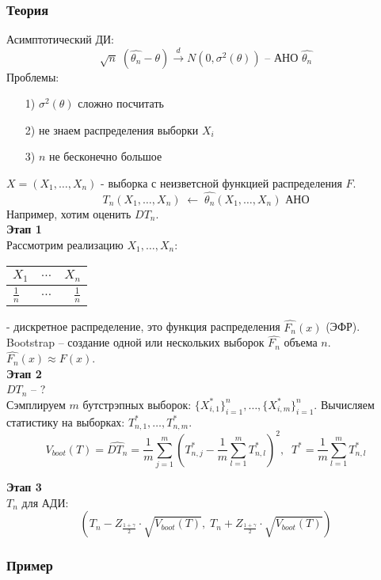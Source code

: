 \subsubsection*{Теория}\label{cha:compl/sec:norm/subsec:bootstrap/subsubsection:theory}

Асимптотический ДИ:
$$\sqrt{n} \; (\hat{\theta_n} - \theta) \xrightarrow[]{d} N(0, \sigma^2(\theta)) \text{ -- АНО } \hat{\theta_n}$$
Проблемы:
\begin{itemize}
	\item[1)] $\sigma^2(\theta)$ сложно посчитать
	\item[2)] не знаем распределения выборки $X_i$
	\item[3)] $n$ не бесконечно большое
\end{itemize}
$X = (X_1, \dots, X_n)$ - выборка с неизветсной функцией распределения $F$.
$$T_n (X_1, \dots, X_n) \; \leftarrow \; \hat{\theta_n} (X_1, \dots, X_n) \text{ АНО}$$
Например, хотим оценить $D T_n$.\\

\textbf{Этап 1}\\
Рассмотрим реализацию $X_1, \dots, X_n$:
\begin{tabular}{| l | c | r |}
	\hline
	$X_1$ & $\dots$ & $X_n$ \\ \hline
	$\frac{1}{n}$ & $\dots$ & $\frac{1}{n}$ \\ \hline
\end{tabular} - дискретное распределение, это функция распределения $\hat{F_n}(x)$ (ЭФР).\\
Bootstrap -- создание одной или нескольких выборок $\hat{F_n}$ объема $n$. $\hat{F_n}(x) \approx F(x)$.\\

\textbf{Этап 2}\\
$D T_n$ -- ?\\
Сэмплируем $m$ бутстрэпных выборок: $\{ X_{i,1}^{*} \}_{i=1}^n, \dots,  \{X_{i,m}^{*} \}_{i=1}^n $. Вычисляем статистику на выборках: $T_{n,1}^{*}, \dots, T_{n,m}^{*}$. 
$$V_{boot} (T) = \hat{D T_n} = \frac{1}{m} \underset{j=1}{\overset{m}{\sum}}\left( T_{n,j}^{*} - \frac{1}{m}\underset{l=1}{\overset{m}{\sum}}T_{n,l}^{*} \right)^2, \;\; T^{*} = \frac{1}{m}\underset{l=1}{\overset{m}{\sum}}T_{n,l}^{*}$$

\textbf{Этап 3}\\
$T_n$ для АДИ:
$$\left( T_n - Z_{\frac{1+\gamma}{2}} \cdot \sqrt{V_{boot}(T)}, \; T_n + Z_{\frac{1+\gamma}{2}} \cdot \sqrt{V_{boot}(T)} \right)$$

\subsubsection*{Пример}\label{cha:compl/sec:nenorm/subsec:bootstrap/subsubsection:prob}


